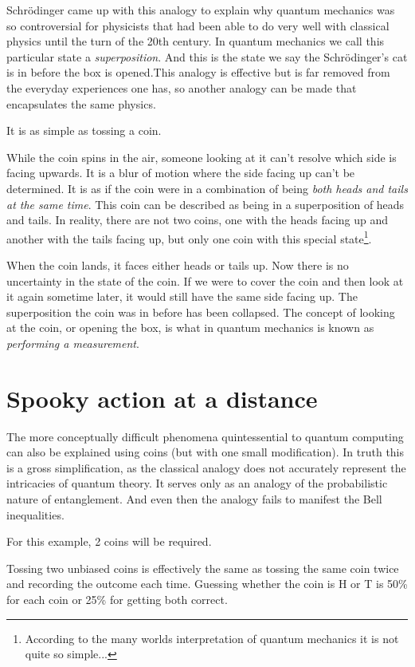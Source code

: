\documentclass{book}
\begin{document}
Schrödinger came up with this analogy to explain why quantum mechanics was so controversial for physicists that had been able to do very well with classical physics until the turn of the 20th century. In quantum mechanics we call this particular state a \textit{superposition}. And this is the state we say the Schrödinger's cat is in before the box is opened.This analogy is effective but is far removed from the everyday experiences one has, so another analogy can be made that encapsulates the same physics. 

It is as simple as tossing a coin.  

While the coin spins in the air, someone looking at it can't resolve which side is facing upwards. It is a blur of motion where the side facing up can't be determined. It is as if the coin were in a combination of being \textit{both heads and tails at the same time}.  This coin can be described as being in a superposition of heads and tails. In reality, there are not two coins, one with the heads facing up and another with the tails facing up, but only one coin with this special state\footnote{According to the many worlds interpretation of quantum mechanics it is not quite so simple...}.

When the coin lands, it faces either heads or tails up. Now there is no uncertainty in the state of the coin. If we were to cover the coin and then look at it again sometime later, it would still have the same side facing up. The superposition the coin was in before has been collapsed. The concept of looking at the coin, or opening the box, is what in quantum mechanics is known as \textit{performing a measurement}.


\section{Spooky action at a distance}

The more conceptually difficult phenomena quintessential to quantum computing can also be explained using coins (but with one small modification). In truth this is a gross simplification, as the classical analogy does not accurately represent the intricacies of quantum theory. It serves only as an analogy of the probabilistic nature of entanglement. And even then the analogy fails to manifest the Bell inequalities. 

For this example, 2 coins will be required. 

Tossing two unbiased coins is effectively the same as tossing the same coin twice and recording the outcome each time. Guessing whether the coin is H or T is 50\% for each coin or 25\% for getting both correct. 
\end{document}
